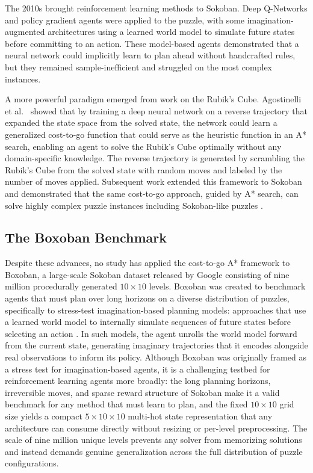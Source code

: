 The 2010s brought reinforcement learning methods to Sokoban. Deep Q-Networks and policy
gradient agents \cite{groshev2018learning} were applied to the puzzle, with some
imagination-augmented architectures \cite{NEURIPS2017_7ca66fc0} using a learned world model to 
simulate future states before committing to an action. These model-based agents demonstrated 
that a neural network could implicitly learn to plan ahead without handcrafted rules, but they 
remained sample-inefficient and struggled on the most complex instances.

A more powerful paradigm emerged from work on the Rubik's Cube. Agostinelli et al.\
\cite{agostinelli2019solving} showed that by training a deep neural network on a reverse trajectory
that expanded the state space from the solved state, the network could learn a generalized cost-to-go
function that could serve as the heuristic function in an A* search, enabling an
agent to solve the Rubik's Cube optimally without any domain-specific knowledge. The reverse trajectory
is generated by scrambling the Rubik's Cube from the solved state with random moves and labeled by the
number of moves applied. Subsequent work extended this framework to Sokoban and demonstrated that the
same cost-to-go approach, guided by A* search, can solve highly complex puzzle instances including
Sokoban-like puzzles \cite{agostinelli2021admissible}.

\subsection*{The Boxoban Benchmark}

Despite these advances, no study has applied the cost-to-go A* framework to Boxoban, a
large-scale Sokoban dataset released by Google consisting of nine million procedurally
generated $10\times10$ levels. Boxoban was created to benchmark agents that must plan
over long horizons on a diverse distribution of puzzles, specifically to stress-test
imagination-based planning models: approaches that use a learned world model to internally
simulate sequences of future states before selecting an action \cite{NEURIPS2017_7ca66fc0}.
In such models, the agent unrolls the world model forward from the current state, generating 
imaginary trajectories that it encodes alongside real observations to inform its policy. Although Boxoban was originally framed as a stress test for imagination-based agents, it is a challenging testbed for reinforcement learning agents more broadly: the long planning horizons, irreversible moves, and sparse reward structure of Sokoban make it a valid benchmark for any method that must learn to plan, and the fixed $10 \times 10$ grid size yields a compact $5 \times 10 \times 10$ multi-hot state representation that any architecture can consume directly without resizing or per-level preprocessing. The scale of nine million unique levels prevents any solver from memorizing solutions and instead demands genuine generalization
across the full distribution of puzzle configurations.

